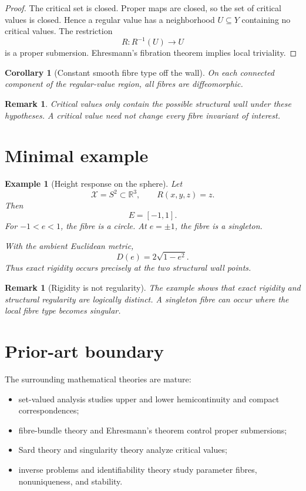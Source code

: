 \documentclass[11pt]{article}
\newtheorem{corollary}[definition]{Corollary}
\newtheorem{example}[definition]{Example}
\newtheorem{remark}[definition]{Remark}
\newcommand{\X}{\mathcal X}
\begin{document}
\begin{proof}
The critical set is closed. Proper maps are closed, so the set of critical
values is closed. Hence a regular value has a neighborhood \(U\subseteq Y\)
containing no critical values. The restriction
\[
R:R^{-1}(U)\to U
\]
is a proper submersion. Ehresmann's fibration theorem implies local triviality.
\end{proof}

\begin{corollary}[Constant smooth fibre type off the wall]
On each connected component of the regular-value region, all fibres are
diffeomorphic.
\end{corollary}

\begin{remark}
Critical values only contain the possible structural wall under these
hypotheses. A critical value need not change every fibre invariant of interest.
\end{remark}

\section{Minimal example}

\begin{example}[Height response on the sphere]
Let
\[
\X=S^2\subset\mathbb R^3,
\qquad
R(x,y,z)=z.
\]
Then
\[
E=[-1,1].
\]
For \(-1<e<1\), the fibre is a circle. At \(e=\pm1\), the fibre is a
singleton.

With the ambient Euclidean metric,
\[
D(e)=2\sqrt{1-e^2}.
\]
Thus exact rigidity occurs precisely at the two structural wall points.
\end{example}

\begin{remark}[Rigidity is not regularity]
The example shows that exact rigidity and structural regularity are logically
distinct. A singleton fibre can occur where the local fibre type becomes
singular.
\end{remark}

\section{Prior-art boundary}

The surrounding mathematical theories are mature:

\begin{itemize}
\item set-valued analysis studies upper and lower hemicontinuity and compact
correspondences;
\item fibre-bundle theory and Ehresmann's theorem control proper submersions;
\item Sard theory and singularity theory analyze critical values;
\item inverse problems and identifiability theory study parameter fibres,
nonuniqueness, and stability.
\end{itemize}
\end{document}
